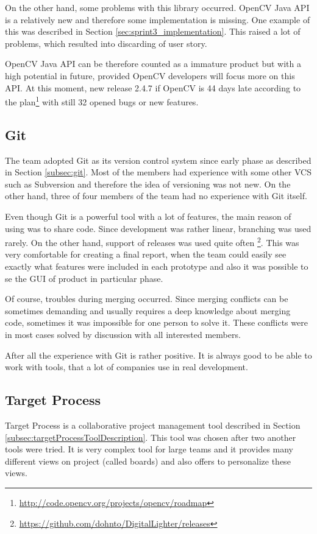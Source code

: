 On the other hand, some problems with this library occurred.
OpenCV Java API is a relatively new and therefore some implementation is missing.
One example of this was described in Section \ref{sec:sprint3_implementation}.
This raised a lot of problems, which resulted into discarding of user story.

OpenCV Java API can be therefore counted as a immature product but with a high potential in future, provided OpenCV developers will focus more on this API.
At this moment, new release 2.4.7 if OpenCV is 44 days late according to the plan\footnote{\url{http://code.opencv.org/projects/opencv/roadmap}} with still 32 opened bugs or new features.

\subsection{Git}
The team adopted Git as its version control system since early phase as described in Section \ref{subsec:git}.
Most of the members had experience with some other VCS such as Subversion and therefore the idea of versioning was not new.
On the other hand, three of four members of the team had no experience with Git itself.

Even though Git is a powerful tool with a lot of features, the main reason of using was to share code.
Since development was rather linear, branching was used rarely.
On the other hand, support of releases was used quite often \footnote{\url{https://github.com/dohnto/DigitalLighter/releases}}.
This was very comfortable for creating a final report, when the team could easily see exactly what features were included in each prototype and also it was possible to se the GUI of product in particular phase.

Of course, troubles during merging occurred.
Since merging conflicts can be sometimes demanding and usually requires a deep knowledge about merging code, sometimes it was impossible for one person to solve it.
These conflicts were in most cases solved by discussion with all interested members.

After all the experience with Git is rather positive. 
It is always good to be able to work with tools, that a lot of companies use in real development.


\subsection{Target Process}
Target Process is a collaborative project management tool described in Section \ref{subsec:targetProcessToolDescription}.
This tool was chosen after two another tools were tried.
It is very complex tool for large teams and it provides many different views on project (called boards) and also offers to personalize these views.

